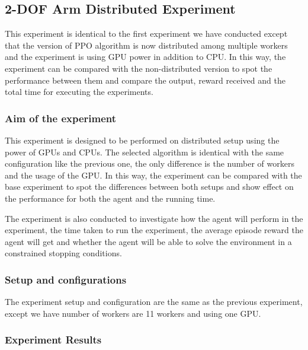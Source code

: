 
\subsection{2-DOF Arm Distributed Experiment}

This experiment is identical to the first experiment we have conducted except that the version of PPO algorithm is now distributed among multiple workers and the experiment is using GPU power in addition to CPU. In this way, the experiment can be compared with the non-distributed version to spot the performance between them and compare the output, reward received and the total time for executing the experiments. 

\subsubsection{Aim of the experiment}

This experiment is designed to be performed on distributed setup using the power of GPUs and CPUs. The selected algorithm is identical with the same configuration like the previous one, the only difference is the number of workers and the usage of the GPU. In this way, the experiment can be compared with the base experiment to spot the differences between both setups and show effect on the performance for both the agent and the running time.

The experiment is also conducted to investigate how the agent will perform in the experiment, the time taken to run the experiment, the average episode reward the agent will get and whether the agent will be able to solve the environment in a constrained stopping conditions.

\subsubsection{Setup and configurations}

The experiment setup and configuration are the same as the previous experiment, except we have number of workers are 11 workers and using one GPU.

\subsubsection{Experiment Results}

